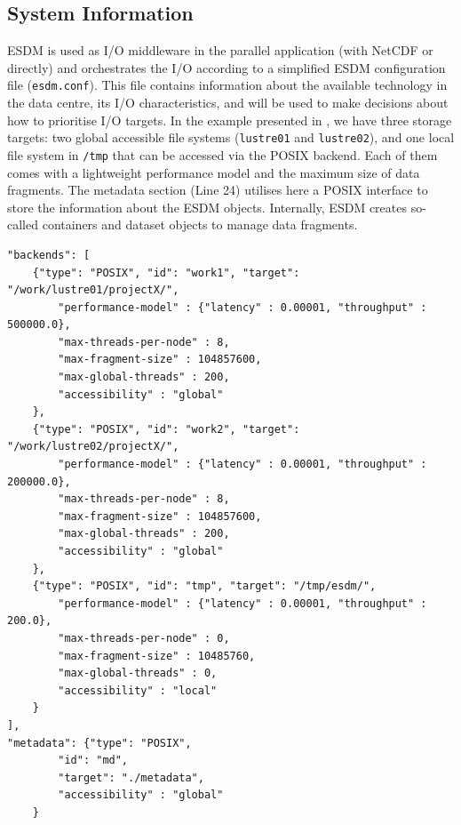 \documentclass{superfri}
\begin{document}
\subsection{System Information}

ESDM is used as I/O middleware in the parallel application (with NetCDF or directly) and orchestrates the I/O according to a simplified ESDM configuration file (\texttt{esdm.conf}).
This file contains information about the available technology in the data centre, its I/O characteristics, and will be used to make decisions about how to prioritise I/O targets.
In the example presented in , we have three storage targets: two global accessible file systems (\texttt{lustre01} and \texttt{lustre02}), and one local file system in \texttt{/tmp} that can be accessed via the POSIX backend.
Each of them comes with a lightweight performance model and the maximum size of data fragments.
The metadata section (Line 24) utilises here a POSIX interface to store the information about the ESDM objects. Internally, ESDM creates so-called containers and dataset objects to manage data fragments.

\begin{lstlisting}[caption = Example of an ESDM configuration file (\texttt{esdm.conf}), label=lst:esdm.conf]
"backends": [
    {"type": "POSIX", "id": "work1", "target": "/work/lustre01/projectX/",
        "performance-model" : {"latency" : 0.00001, "throughput" : 500000.0},
        "max-threads-per-node" : 8,
        "max-fragment-size" : 104857600,
        "max-global-threads" : 200,
        "accessibility" : "global"
    },
    {"type": "POSIX", "id": "work2", "target": "/work/lustre02/projectX/",
        "performance-model" : {"latency" : 0.00001, "throughput" : 200000.0},
        "max-threads-per-node" : 8,
        "max-fragment-size" : 104857600,
        "max-global-threads" : 200,
        "accessibility" : "global"
    },
    {"type": "POSIX", "id": "tmp", "target": "/tmp/esdm/",
        "performance-model" : {"latency" : 0.00001, "throughput" : 200.0},
        "max-threads-per-node" : 0,
        "max-fragment-size" : 10485760,
        "max-global-threads" : 0,
        "accessibility" : "local"
    }
],
"metadata": {"type": "POSIX",
        "id": "md",
        "target": "./metadata",
        "accessibility" : "global"
    }
\end{lstlisting}
\end{document}
